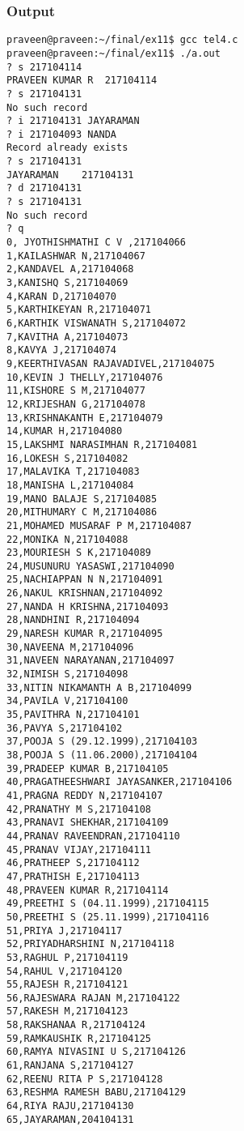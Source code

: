 \documentclass[11pt]{article}
\begin{document}
\subsubsection{Output}
\label{sec-5-1-1}
\begin{verbatim}
praveen@praveen:~/final/ex11$ gcc tel4.c
praveen@praveen:~/final/ex11$ ./a.out
? s 217104114
PRAVEEN KUMAR R	 217104114
? s 217104131
No such record
? i 217104131 JAYARAMAN
? i 217104093 NANDA
Record already exists
? s 217104131
JAYARAMAN	 217104131
? d 217104131
? s 217104131
No such record
? q
0, JYOTHISHMATHI C V ,217104066
1,KAILASHWAR N,217104067
2,KANDAVEL A,217104068
3,KANISHQ S,217104069
4,KARAN D,217104070
5,KARTHIKEYAN R,217104071
6,KARTHIK VISWANATH S,217104072
7,KAVITHA A,217104073
8,KAVYA J,217104074
9,KEERTHIVASAN RAJAVADIVEL,217104075
10,KEVIN J THELLY,217104076
11,KISHORE S M,217104077
12,KRIJESHAN G,217104078
13,KRISHNAKANTH E,217104079
14,KUMAR H,217104080
15,LAKSHMI NARASIMHAN R,217104081
16,LOKESH S,217104082
17,MALAVIKA T,217104083
18,MANISHA L,217104084
19,MANO BALAJE S,217104085
20,MITHUMARY C M,217104086
21,MOHAMED MUSARAF P M,217104087
22,MONIKA N,217104088
23,MOURIESH S K,217104089
24,MUSUNURU YASASWI,217104090
25,NACHIAPPAN N N,217104091
26,NAKUL KRISHNAN,217104092
27,NANDA H KRISHNA,217104093
28,NANDHINI R,217104094
29,NARESH KUMAR R,217104095
30,NAVEENA M,217104096
31,NAVEEN NARAYANAN,217104097
32,NIMISH S,217104098
33,NITIN NIKAMANTH A B,217104099
34,PAVILA V,217104100
35,PAVITHRA N,217104101
36,PAVYA S,217104102
37,POOJA S (29.12.1999),217104103
38,POOJA S (11.06.2000),217104104
39,PRADEEP KUMAR B,217104105
40,PRAGATHEESHWARI JAYASANKER,217104106
41,PRAGNA REDDY N,217104107
42,PRANATHY M S,217104108
43,PRANAVI SHEKHAR,217104109
44,PRANAV RAVEENDRAN,217104110
45,PRANAV VIJAY,217104111
46,PRATHEEP S,217104112
47,PRATHISH E,217104113
48,PRAVEEN KUMAR R,217104114
49,PREETHI S (04.11.1999),217104115
50,PREETHI S (25.11.1999),217104116
51,PRIYA J,217104117
52,PRIYADHARSHINI N,217104118
53,RAGHUL P,217104119
54,RAHUL V,217104120
55,RAJESH R,217104121
56,RAJESWARA RAJAN M,217104122
57,RAKESH M,217104123
58,RAKSHANAA R,217104124
59,RAMKAUSHIK R,217104125
60,RAMYA NIVASINI U S,217104126
61,RANJANA S,217104127
62,REENU RITA P S,217104128
63,RESHMA RAMESH BABU,217104129
64,RIYA RAJU,217104130
65,JAYARAMAN,204104131
\end{verbatim}
\end{document}
